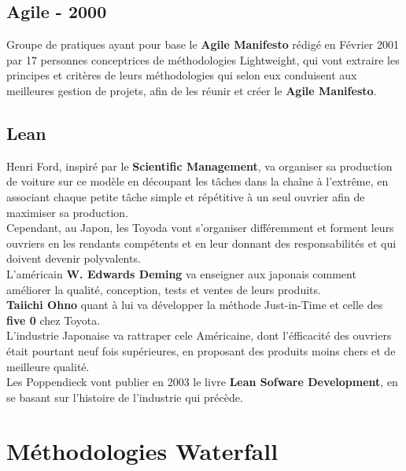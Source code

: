 \documentclass{report}
\begin{document}
	\section{Agile - 2000}

		Groupe de pratiques ayant pour base le \textbf{Agile Manifesto} rédigé en Février 2001 par 17 personnes conceptrices de méthodologies Lightweight, qui vont extraire les principes et critères de leurs méthodologies qui selon eux conduisent aux meilleures gestion de projets, afin de les réunir et créer le \textbf{Agile Manifesto}.\\

	\section{Lean}

		Henri Ford, inspiré par le \textbf{Scientific Management}, va organiser sa production de voiture sur ce modèle en découpant les tâches dans la chaîne à l'extrême, en associant chaque petite tâche simple et répétitive à un seul ouvrier afin de maximiser sa production.\\

		Cependant, au Japon, les Toyoda vont s'organiser différemment et forment leurs ouvriers en les rendants compétents et en leur donnant des responsabilités et qui doivent devenir polyvalents.\\

		L'américain \textbf{W. Edwards Deming} va enseigner aux japonais comment améliorer la qualité, conception, tests et ventes de leurs produits.\\
		\textbf{Taiichi Ohno} quant à lui va développer la méthode Just-in-Time et celle des \textbf{five 0} chez Toyota.\\

		L'industrie Japonaise va rattraper cele Américaine, dont l'éfficacité des ouvriers était pourtant neuf fois supérieures, en proposant des produits moins chers et de meilleure qualité.\\

		Les Poppendieck vont publier en 2003 le livre \textbf{Lean Sofware Development}, en se basant sur l'histoire de l'industrie qui précède.\\


\chapter{Méthodologies Waterfall}
\end{document}

